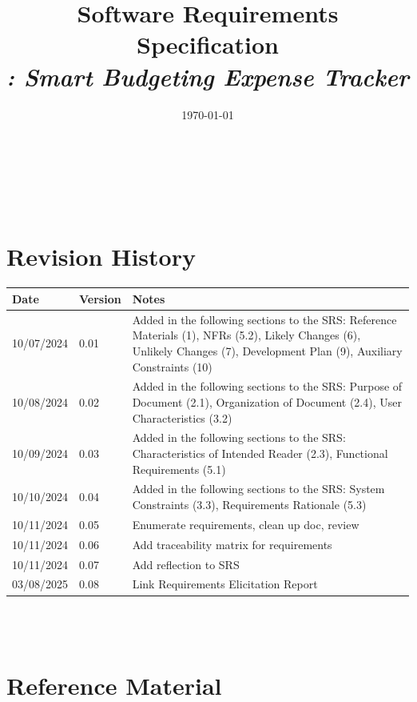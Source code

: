\documentclass[12pt]{article}
\begin{document}
\title{Software Requirements Specification \\ \textit{\progname: Smart Budgeting Expense Tracker}} 
\author{\authname}
\date{\today}
	
\maketitle

~\newpage


\tableofcontents

~\newpage

\section*{Revision History}

\begin{tabularx}{\textwidth}{p{3cm}p{2cm}X}
\toprule {\bf Date} & {\bf Version} & {\bf Notes}\\
\midrule
10/07/2024 & 0.01 & Added in the following sections to the SRS: Reference Materials (1), NFRs (5.2), Likely Changes (6), Unlikely Changes (7), Development Plan (9), Auxiliary Constraints (10)\\
10/08/2024 & 0.02 & Added in the following sections to the SRS: Purpose of Document (2.1), Organization of Document (2.4), User Characteristics (3.2)\\
10/09/2024 & 0.03 & Added in the following sections to the SRS: Characteristics of Intended Reader (2.3), Functional Requirements (5.1)\\
10/10/2024 & 0.04 & Added in the following sections to the SRS: System Constraints (3.3), Requirements Rationale (5.3)\\
10/11/2024 & 0.05 & Enumerate requirements, clean up doc, review\\
10/11/2024 & 0.06 & Add traceability matrix for requirements\\
10/11/2024 & 0.07 & Add reflection to SRS\\
03/08/2025 & 0.08 & Link Requirements Elicitation Report\\
\bottomrule 
\end{tabularx}

~\\


~\newpage

\section{Reference Material}
\end{document}
